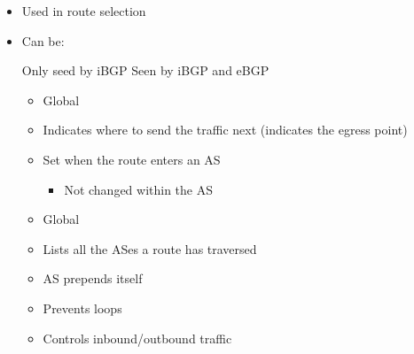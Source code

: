 \begin{itemize}
\begin{itemize}
\begin{itemize}
\begin{itemize}
\begin{itemize}
\begin{itemize}
                                            \item Used in route selection
                                            \item Can be:
                                                \begin{itemize}
                                                     Only seed by iBGP
                                                     Seen by iBGP and eBGP
                                                \end{itemize}
                                                \begin{itemize}
                                                    \item Global
                                                    \item Indicates where to send the traffic next (indicates the egress point)
                                                    \item Set when the route enters an AS
                                                        \begin{itemize}
                                                            \item Not changed within the AS
                                                        \end{itemize}
                                                \end{itemize}
                                                \begin{itemize}
                                                    \item Global
                                                    \item Lists all the ASes a route has traversed
                                                    \item AS prepends itself
                                                    \item Prevents loops
                                                    \item Controls inbound/outbound traffic
                                                \end{itemize}
                                                \begin{itemize}

\end{itemize}
\end{itemize}
\end{itemize}
\end{itemize}
\end{itemize}
\end{itemize}
\end{itemize}
